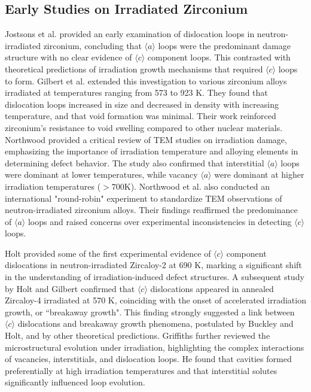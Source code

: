 \documentclass[12pt]{article}
\begin{document}
\subsection*{Early Studies on Irradiated Zirconium}
Jostsons et al. \cite{jostsons1977nature} provided an early examination of dislocation loops in neutron-irradiated zirconium, concluding that $\langle a\rangle$ loops were the predominant damage structure with no clear evidence of $\langle c\rangle$ component loops. This contrasted with theoretical predictions of irradiation growth mechanisms that required $\langle c\rangle$ loops to form. Gilbert et al. \cite{gilbert1979damage} extended this investigation to various zirconium alloys irradiated at temperatures ranging from 573 to 923 K. They found that dislocation loops increased in size and decreased in density with increasing temperature, and that void formation was minimal. Their work reinforced zirconium's resistance to void swelling compared to other nuclear materials. Northwood \cite{northwood1977irradiation} provided a critical review of TEM studies on irradiation damage, emphasizing the importance of irradiation temperature and alloying elements in determining defect behavior. The study also confirmed that interstitial $\langle a\rangle$ loops were dominant at lower temperatures, while vacancy $\langle a\rangle$ were dominant at higher irradiation temperatures ($>700$K). Northwood et al. \cite{northwood1977irradiation} also conducted an international "round-robin" experiment to standardize TEM observations of neutron-irradiated zirconium alloys. Their findings reaffirmed the predominance of $\langle a\rangle$ loops and raised concerns over experimental inconsistencies in detecting $\langle c\rangle$ loops.

Holt \cite{holt1983c} provided some of the first experimental evidence of $\langle c\rangle$ component dislocations in neutron-irradiated Zircaloy-2 at 690 K, marking a significant shift in the understanding of irradiation-induced defect structures. A subsequent study by Holt and Gilbert \cite{holt1986c} confirmed that $\langle c\rangle$ dislocations appeared in annealed Zircaloy-4 irradiated at 570 K, coinciding with the onset of accelerated irradiation growth, or ``breakaway growth". This finding strongly suggested a link between $\langle c\rangle$ dislocations and breakaway growth phenomena, postulated by Buckley and Holt, and by other theoretical predictions. Griffiths \cite{griffiths1988review} further reviewed the microstructural evolution under irradiation, highlighting the complex interactions of vacancies, interstitials, and dislocation loops. He found that cavities formed preferentially at high irradiation temperatures and that interstitial solutes significantly influenced loop evolution.
\end{document}

